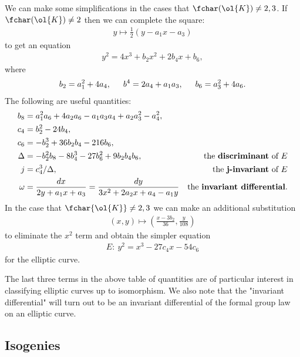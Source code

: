 We can make some simplifications in the cases that $\fchar(\ol{K}) \neq 2,3$. If $\fchar(\ol{K}) \neq 2$ then we can complete the square:
\begin{align*}
	y \mapsto \frac{1}{2}(y - a_1x - a_3)
\end{align*}
to get an equation
\begin{align*}
	y^2 = 4x^3 + b_2x^2 + 2b_4x + b_6,
\end{align*}
where
\begin{align*}
	b_2 = a_1^2 + 4a_4,\hspace{1.5em} b^4 = 2a_4+a_1a_3,\hspace{1.5em} b_6 = a_3^2+4a_6.
\end{align*}
The following are useful quantities:
\begin{align*}
	b_8 &= a_1^2a_6+4a_2a_6-a_1a_3a_4+a_2a_3^2-a_4^2, & \\
	c_4 &= b_2^2 - 24b_4, & \\
	c_6 &= -b_2^3+36b_2b_4 - 216b_6, & \\
	\Delta &= -b_2^2b_8-8b_4^3-27b_6^2+9b_2b_4b_6, & \text{the \textbf{discriminant} of $E$} \\
	j &= c_4^3/\Delta, &\text{the \textbf{j-invariant} of $E$} \\
	\omega &= \frac{dx}{2y+a_1x+a_3} = \frac{dy}{3x^2+2a_2x+a_4-a_1y} &\text{the \textbf{invariant differential}}.
\end{align*}
In the case that $\fchar{\ol{K}} \neq 2,3$ we can make an additional substitution
\begin{align*}
	(x,y) \mapsto \left(\frac{x - 3b_2}{36}, \frac{y}{108}\right)
\end{align*}
to eliminate the $x^2$ term and obtain the simpler equation
\begin{align*}
	E:~y^2 = x^3 - 27c_4x-54c_6
\end{align*}
for the elliptic curve.

The last three terms in the above table of quantities are of particular interest in classifying elliptic curves up to isomorphism. We also note that the "invariant differential" will turn out to be an invariant differential of the formal group law on an elliptic curve.

\subsection{Isogenies}


